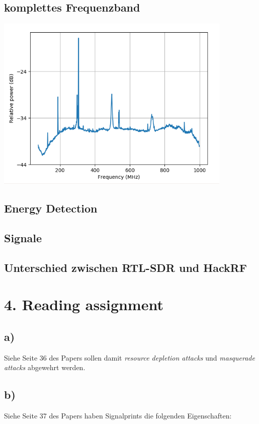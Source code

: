 \documentclass[12pt,a4paper]{article}
\begin{document}
\subsection{komplettes Frequenzband}
\includegraphics[width=0.85\textwidth ]{Bilder/A3_full_frequency_band.png}

\subsection{Energy Detection}

\subsection{Signale}

\subsection{Unterschied zwischen RTL-SDR und HackRF}

\newpage
\section{4. Reading assignment}

\subsection{a)} 
Siehe Seite 36 des Papers sollen damit \textit{resource 
depletion attacks} und \textit{masquerade attacks} 
abgewehrt werden.


\subsection{b)} 
Siehe Seite 37 des Papers haben Signalprints die folgenden 
Eigenschaften:
\end{document}
